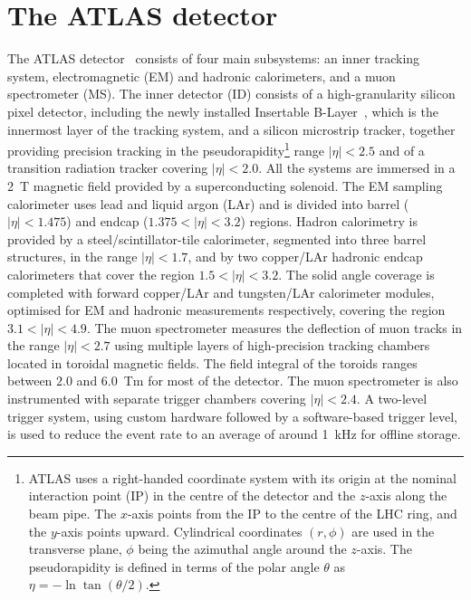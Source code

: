\section{The ATLAS detector}
\label{s:atlas}

The ATLAS detector~\cite{PERF-2007-01} consists of four main subsystems: an
inner tracking system, electromagnetic (EM) and hadronic calorimeters, and a
muon spectrometer (MS).  The inner detector (ID) consists of a high-gra\-nu\-la\-ri\-ty
silicon pixel detector, including the newly installed Insertable
B-Layer~\cite{ATL-INDET-PUB-2015-001}, which is the innermost layer of the
tracking system, and a silicon microstrip tracker, together providing precision
tracking in the pseudorapidity\footnote{ATLAS uses a right-handed coordinate
system with its origin at the nominal interaction point (IP) in the centre of
the detector and the $z$-axis along the beam pipe. The $x$-axis points from the
IP to the centre of the LHC ring, and the $y$-axis points upward. Cylindrical
coordinates $(r,\phi)$ are used in the transverse plane, $\phi$ being the
azimuthal angle around the $z$-axis. The pseudorapidity is defined in terms of
the polar angle $\theta$ as $\eta=-\ln\tan(\theta/2)$.} range $|\eta|<2.5$ and
of a transition radiation tracker covering $|\eta|<2.0$. All the systems are immersed in a
\SI{2}{T} magnetic field provided by a superconducting solenoid.  The EM
sampling calorimeter uses lead and liquid argon (LAr) and is divided into
barrel ($|\eta|<1.475$) and endcap ($1.375<|\eta|<3.2$) regions.  Hadron
calorimetry is provided by a steel/scintillator-tile calorimeter, segmented
into three barrel structures, in the range $|\eta|<1.7$, and by two copper/LAr
hadronic endcap calorimeters that cover the region $1.5<|\eta|<3.2$. The solid
angle coverage is completed with forward copper/LAr and tungsten/LAr
calorimeter modules, optimised for EM and hadronic measurements respectively,
covering the region $3.1<|\eta|<4.9$. The muon spectrometer measures the
deflection of muon tracks in the range $|\eta|<2.7$ using multiple layers of
high-precision tracking chambers located in toroidal magnetic fields.
The field integral of the toroids ranges between $2.0$ and \SI{6.0}{Tm} for
most of the detector.  The muon spectrometer is also instrumented with separate
trigger chambers covering $|\eta|<2.4$.  A two-level trigger system, using
custom hardware followed by a software-based trigger level, is used to reduce the event
rate to an average of around \SI{1}{kHz} for offline storage. 
